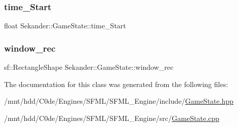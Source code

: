 \subsubsection{\texorpdfstring{time\+\_\+\+Start}{time\_Start}}
{\footnotesize\ttfamily float Sekander\+::\+Game\+State\+::time\+\_\+\+Start\hspace{0.3cm}{\ttfamily [private]}}

\mbox{\label{classSekander_1_1GameState_ad44c780816824050101c1489f0f231be}} 
\subsubsection{\texorpdfstring{window\+\_\+rec}{window\_rec}}
{\footnotesize\ttfamily sf\+::\+Rectangle\+Shape Sekander\+::\+Game\+State\+::window\+\_\+rec\hspace{0.3cm}{\ttfamily [private]}}



The documentation for this class was generated from the following files\+:\begin{DoxyCompactItemize}
\item 
/mnt/hdd/\+C0de/\+Engines/\+S\+F\+M\+L/\+S\+F\+M\+L\+\_\+\+Engine/include/\hyperlink{GameState_8hpp}{Game\+State.\+hpp}\item 
/mnt/hdd/\+C0de/\+Engines/\+S\+F\+M\+L/\+S\+F\+M\+L\+\_\+\+Engine/src/\hyperlink{GameState_8cpp}{Game\+State.\+cpp}\end{DoxyCompactItemize}
